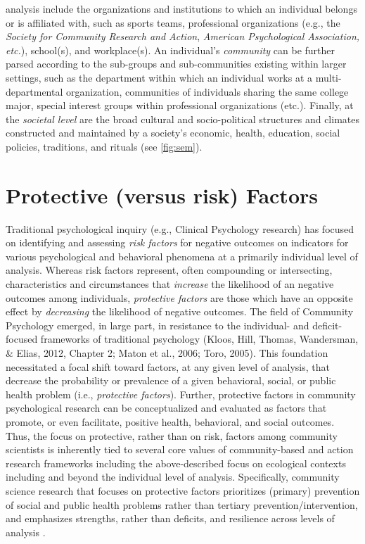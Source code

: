 \documentclass[11pt,]{tufte-book}
\begin{document}
analysis include the organizations and institutions to which an
individual belongs or is affiliated with, such as sports teams,
professional organizations (e.g., the \emph{Society for Community
Research and Action}, \emph{American Psychological Association, etc.}),
school(s), and workplace(s). An individual's \emph{community} can be
further parsed according to the sub-groups and sub-communities existing
within larger settings, such as the department within which an
individual works at a multi-departmental organization, communities of
individuals sharing the same college major, special interest groups
within professional organizations (etc.). Finally, at the \emph{societal
level} are the broad cultural and socio-political structures and
climates constructed and maintained by a society's economic, health,
education, social policies, traditions, and rituals (see
\cref{fig:sem}).

\section{Protective (versus risk)
Factors}\label{protective-versus-risk-factors}

Traditional psychological inquiry (e.g., Clinical Psychology research)
has focused on identifying and assessing \emph{risk factors} for
negative outcomes on indicators for various psychological and behavioral
phenomena at a primarily individual level of analysis. Whereas risk
factors represent, often compounding or intersecting, characteristics
and circumstances that \emph{increase} the likelihood of an negative
outcomes among individuals, \emph{protective factors} are those which
have an opposite effect by \emph{decreasing} the likelihood of negative
outcomes. The field of Community Psychology emerged, in large part, in
resistance to the individual- and deficit-focused frameworks of
traditional psychology (Kloos, Hill, Thomas, Wandersman, \& Elias, 2012,
Chapter 2; Maton et al., 2006; Toro, 2005). This foundation necessitated
a focal shift toward factors, at any given level of analysis, that
decrease the probability or prevalence of a given behavioral, social, or
public health problem (i.e., \emph{protective factors}). Further,
protective factors in community psychological research can be
conceptualized and evaluated as factors that promote, or even
facilitate, positive health, behavioral, and social outcomes. Thus, the
focus on protective, rather than on risk, factors among community
scientists is inherently tied to several core values of community-based
and action research frameworks including the above-described focus on
ecological contexts including and beyond the individual level of
analysis. Specifically, community science research that focuses on
protective factors prioritizes (primary) prevention of social and public
health problems rather than tertiary prevention/intervention, and
emphasizes strengths, rather than deficits, and resilience across levels
of analysis .
\end{document}
